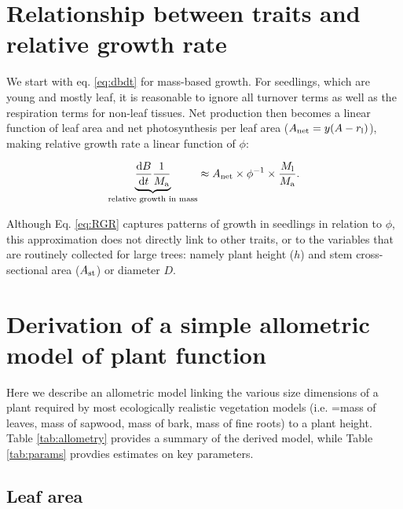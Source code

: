\documentclass[a4paper,11pt]{article}
\begin{document}
\begin{appendices}
\setcounter{figure}{0} \renewcommand{\thefigure}{S\arabic{figure}}
\setcounter{table}{0} \renewcommand{\thetable}{S\arabic{table}}

\section{Relationship between traits and relative growth rate} \label{app:traits-RGR}

We start with eq. \ref{eq:dbdt} for mass-based growth. For seedlings, which are
young and mostly leaf, it is reasonable to ignore all turnover terms as
well as the respiration terms for non-leaf tissues. Net production then
becomes a linear function of leaf area and net photosynthesis per leaf
area ($A_\textrm{net} = y(A - r_{\rm l})$), making relative growth
rate a linear function of $\phi$:

\begin{equation}\label{eq:RGR}
\underbrace{\strut\frac{{\rm d}B}{{\rm d}t}\frac{1}{M_{\rm a}}}_\textrm{relative growth in mass}  \approx A_\textrm{net} \times \phi^{-1} \times \frac{M_{\rm l}}{M_{\rm a}}. \end{equation}

Although Eq. \ref{eq:RGR} captures patterns of growth in seedlings in
relation to $\phi$\citep{Wright-2000}, this
approximation does not directly link to other traits, or to the
variables that are routinely collected for large trees: namely plant
height ($h$) and stem cross-sectional area ($A_{\rm st}$) or
diameter $D$.


\section{Derivation of a simple allometric model of plant
function}\label{app:func_balance}

Here we describe an allometric model linking the various size dimensions
of a plant required by most ecologically realistic vegetation models
(i.e. =mass of leaves, mass of sapwood, mass of bark, mass of fine
roots) to a plant height. Table \ref{tab:allometry} provides a summary
of the derived model, while Table \ref{tab:params} provdies estimates on
key parameters.


\subsection{Leaf area}\label{leaf-area}


\end{appendices}
\end{document}

